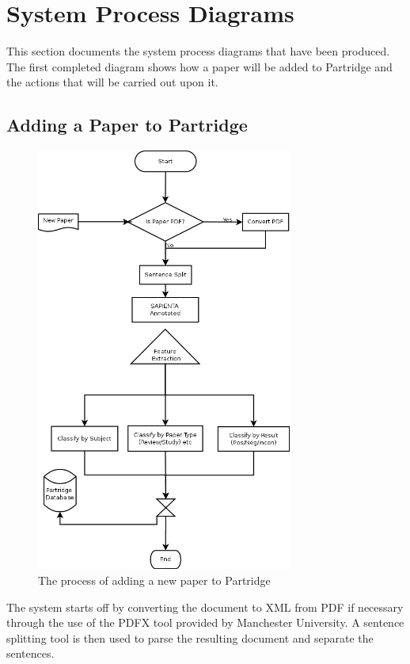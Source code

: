 \section{System Process Diagrams}
\label{sec:system_diagrams}

This section documents the system process diagrams that have been produced. The
first completed diagram shows how a paper will be added to Partridge and the
actions that will be carried out upon it.

\subsection{Adding a Paper to Partridge}

\begin{figure}[!ht]
\includegraphics[width=0.75\textwidth]{images/PaperAddedProcess.png}
\caption{The process of adding a new paper to Partridge}
\end{figure}

The system starts off by converting the document to XML from PDF if necessary
through the use of the PDFX tool provided by Manchester University. A sentence
splitting tool is then used to parse the resulting document and separate the
sentences.

